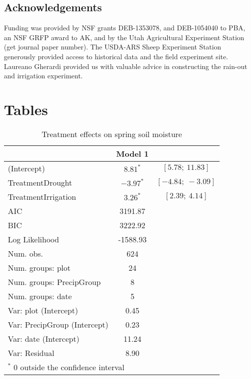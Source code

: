 \documentclass[11pt]{article}
\begin{document}
\begin{doublespacing}
\section*{Acknowledgements}

Funding was provided by NSF grants DEB-1353078, and DEB-1054040 to PBA, an NSF GRFP award to AK, and by the Utah Agricultural Experiment Station (get journal paper number). The USDA-ARS Sheep Experiment Station generously provided access to historical data and the field experiment site. Laureano Gherardi provided us with valuable advice in constructing the rain-out and irrigation experiment. 

\newpage




\end{doublespacing} 

\clearpage
\newpage

\section*{Tables}

\begin{table}[h]
	\caption{Treatment effects on spring soil moisture}
	\centering
	\begin{tabular}{l c c }
		\hline
		& Model 1 \\
		\hline
		(Intercept)                  & $8.81^{*}$    	& $[5.78;\ 11.83]$  \\
		TreatmentDrought             & $-3.97^{*}$      & $[-4.84;\ -3.09]$ \\
		TreatmentIrrigation          & $3.26^{*}$       & $[2.39;\ 4.14]$   \\
		\hline
		AIC                          & 3191.87           \\
		BIC                          & 3222.92           \\
		Log Likelihood               & -1588.93          \\
		Num. obs.                    & 624               \\
		Num. groups: plot            & 24                \\
		Num. groups: PrecipGroup     & 8                 \\
		Num. groups: date            & 5                 \\
		Var: plot (Intercept)        & 0.45              \\
		Var: PrecipGroup (Intercept) & 0.23              \\
		Var: date (Intercept)        & 11.24             \\
		Var: Residual                & 8.90              \\
		\hline
		\multicolumn{2}{l}{\scriptsize{$^*$ 0 outside the confidence interval}}
	\end{tabular}
	\label{table:spotVWC}
\end{table}
\end{document}
